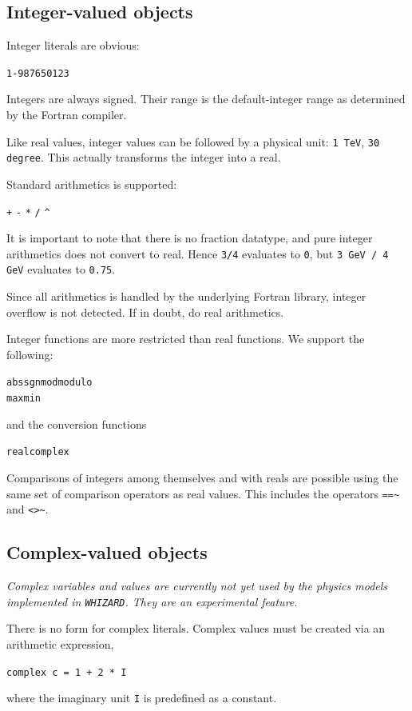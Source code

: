 \documentclass[12pt]{book}
\newcommand{\ttt}[1]{\texttt{#1}}
\newcommand{\whizard}{\texttt{WHIZARD}}
\begin{document}
\subsection{Integer-valued objects}
\label{sec:integer}

Integer literals are obvious:
\begin{center}
\ttt{1}\quad \ttt{-98765}\quad \ttt{0123}
\end{center}
Integers are always signed.  Their range is the default-integer range as
determined by the Fortran compiler.

Like real values, integer values can be followed by a physical unit: \ttt{1
  TeV}, \ttt{30 degree}.  This actually transforms the integer into a real.

Standard arithmetics is supported:
\begin{center}
  \verb|+| \verb|-| \verb|*| \verb|/| \verb|^|
\end{center}
It is important to note that there is no fraction datatype, and pure integer
arithmetics does not convert to real.  Hence \ttt{3/4} evaluates to \ttt{0},
but \ttt{3 GeV / 4 GeV} evaluates to \ttt{0.75}.

Since all arithmetics is handled by the underlying Fortran library, integer
overflow is not detected.  If in doubt, do real arithmetics.

Integer functions are more restricted than real functions.  We support the
following:
\begin{center}
  \ttt{abs}\quad \ttt{sgn}\quad \ttt{mod}\quad \ttt{modulo}
\\
  \ttt{max}\quad \ttt{min}
\end{center}
and the conversion functions
\begin{center}
  \ttt{real}\quad \ttt{complex}
\end{center}
Comparisons of integers among themselves and with reals are possible using the
same set of comparison operators as real values.  This includes the operators
\verb|==~| and \verb|<>~|.


\subsection{Complex-valued objects}
\label{sec:complex}

\emph{Complex variables and values are currently not yet used by the physics
  models implemented in \whizard.  They are an experimental feature.}

There is no form for complex literals.  Complex values must be created via an
arithmetic expression,
\begin{center}
  \ttt{complex c = 1 + 2 * I}
\end{center}
where the imaginary unit \ttt{I} is predefined as a constant.
\end{document}
